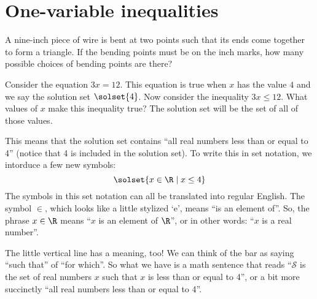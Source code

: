 %
%
%

\section{One-variable inequalities}
\label{sec:ineqonevar}

\begin{boxexplore}
A nine-inch piece of wire is bent at two points such that its ends come together to form a triangle. If the bending points must be on the inch marks, how many possible choices of bending points are there?
\end{boxexplore}

Consider the equation $3x = 12$. This equation is true when $x$ has the value $4$ and we say the solution set $\solset{4}$. Now consider the inequality $3x \leq 12$. What values of $x$ make this inequality true? The solution set will be the set of all of those values. 

This means that the solution set contains ``all real numbers less than or equal to 4'' (notice that 4 is included in the solution set). To write this in set notation, we intorduce a few new symbols: \[\solset{x \in \R \mid x \leq 4}\]
The symbols in this set notation can all be translated into regular English. The symbol $\in$, which looks like a little stylized `e', means ``is an element of''. So, the phrase $x\in\R$ means ``$x$ is an element of $\R$'', or in other words: ``$x$ is a real number''.

The little vertical line has a meaning, too! We can think of the bar as saying ``such that'' of ``for which''. So what we have is a math sentence that reads ``$\mathcal{S}$ is the set of real numbers $x$ such that $x$ is less than or equal to 4'', or a bit more succinctly ``all real numbers less than or equal to 4''.


